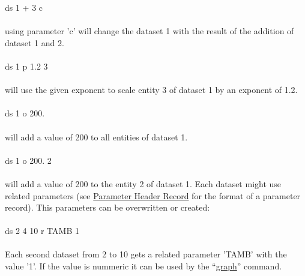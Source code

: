 \documentclass{article}
\providecommand{\htmlref}[2]{\hyperref[#2]{#1}}
\begin{document}
ds 1 + 3 c\\\\
using parameter 'c' will change the dataset 1 with the result of the addition of dataset 1 and 2. \\\\ 
ds 1 p 1.2 3\\\\
will use the given exponent to scale entity 3 of dataset 1 by an exponent of 1.2.\\\\
ds 1 o 200.\\\\
will add a value of 200 to all entities of dataset 1.\\\\
ds 1 o 200. 2\\\\
will add a value of 200 to the entity 2 of dataset 1.
Each dataset might use related parameters (see \htmlref{Parameter Header Record}{Parameter Header Record} for the format of a parameter record). This parameters can be overwritten or created:\\\\
ds 2 4 10 r TAMB 1\\\\
Each second dataset from 2 to 10 gets a related parameter 'TAMB' with the value '1'. If the value is nummeric it can be used by the ``\htmlref{graph}{graph}'' command. 
\end{document}
